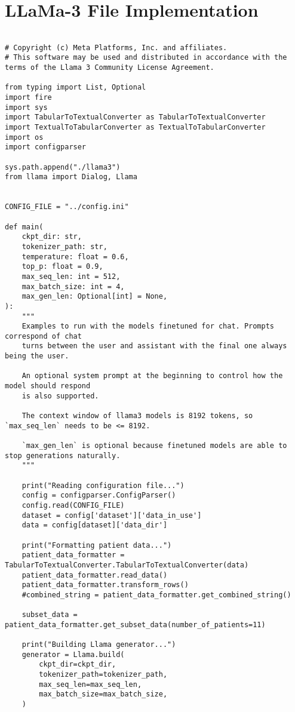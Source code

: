 \chapter*{LLaMa-3 File Implementation}
\label{app:llama_implementation}

\begin{verbatim}

# Copyright (c) Meta Platforms, Inc. and affiliates.
# This software may be used and distributed in accordance with the terms of the Llama 3 Community License Agreement.

from typing import List, Optional
import fire
import sys
import TabularToTextualConverter as TabularToTextualConverter
import TextualToTabularConverter as TextualToTabularConverter
import os
import configparser

sys.path.append("./llama3")
from llama import Dialog, Llama


CONFIG_FILE = "../config.ini"

def main(
    ckpt_dir: str,
    tokenizer_path: str,
    temperature: float = 0.6,
    top_p: float = 0.9,
    max_seq_len: int = 512,
    max_batch_size: int = 4,
    max_gen_len: Optional[int] = None,
):
    """
    Examples to run with the models finetuned for chat. Prompts correspond of chat
    turns between the user and assistant with the final one always being the user.

    An optional system prompt at the beginning to control how the model should respond
    is also supported.

    The context window of llama3 models is 8192 tokens, so `max_seq_len` needs to be <= 8192.

    `max_gen_len` is optional because finetuned models are able to stop generations naturally.
    """

    print("Reading configuration file...")
    config = configparser.ConfigParser()
    config.read(CONFIG_FILE)
    dataset = config['dataset']['data_in_use']
    data = config[dataset]['data_dir']

    print("Formatting patient data...")
    patient_data_formatter = TabularToTextualConverter.TabularToTextualConverter(data)
    patient_data_formatter.read_data()
    patient_data_formatter.transform_rows()
    #combined_string = patient_data_formatter.get_combined_string()

    subset_data = patient_data_formatter.get_subset_data(number_of_patients=11)

    print("Building Llama generator...")
    generator = Llama.build(
        ckpt_dir=ckpt_dir,
        tokenizer_path=tokenizer_path,
        max_seq_len=max_seq_len,
        max_batch_size=max_batch_size,
    )


\end{verbatim}
